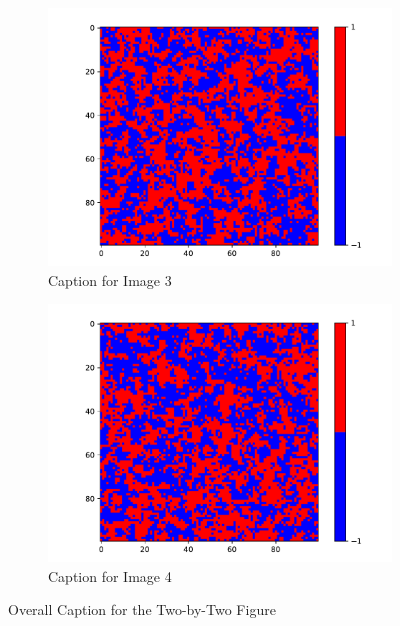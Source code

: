 \begin{figure}
    \begin{subfigure}{0.45\textwidth}
      \centering
      \includegraphics[width=\linewidth]{images/Ising3_3.pdf}
      \caption{Caption for Image 3}
      \label{fig:image3}
    \end{subfigure}
    \hfill
    \begin{subfigure}{0.45\textwidth}
      \centering
      \includegraphics[width=\linewidth]{images/Ising3_4.pdf}
      \caption{Caption for Image 4}
      \label{fig:image4}
    \end{subfigure}
    \caption{Overall Caption for the Two-by-Two Figure}
    \label{fig:two_by_two}
  \end{figure}